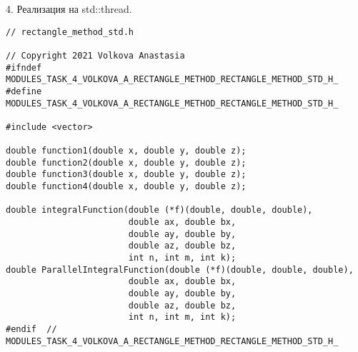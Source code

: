 \documentclass{report}
\begin{document}
\par 4. Реализация на std::thread.
\begin{lstlisting}
// rectangle_method_std.h

// Copyright 2021 Volkova Anastasia
#ifndef MODULES_TASK_4_VOLKOVA_A_RECTANGLE_METHOD_RECTANGLE_METHOD_STD_H_
#define MODULES_TASK_4_VOLKOVA_A_RECTANGLE_METHOD_RECTANGLE_METHOD_STD_H_

#include <vector>

double function1(double x, double y, double z);
double function2(double x, double y, double z);
double function3(double x, double y, double z);
double function4(double x, double y, double z);

double integralFunction(double (*f)(double, double, double),
                        double ax, double bx,
                        double ay, double by,
                        double az, double bz,
                        int n, int m, int k);
double ParallelIntegralFunction(double (*f)(double, double, double),
                        double ax, double bx,
                        double ay, double by,
                        double az, double bz,
                        int n, int m, int k);
#endif  // MODULES_TASK_4_VOLKOVA_A_RECTANGLE_METHOD_RECTANGLE_METHOD_STD_H_

\end{lstlisting}
\end{document}
